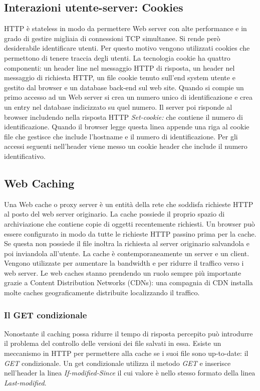 \subsection{Interazioni utente-server: Cookies}
HTTP \`e stateless in modo da permettere Web server con alte performance e in grado di gestire migliaia di connessioni TCP simultanee. Si rende per\`o desiderabile identificare utenti. Per questo motivo 
vengono utilizzati cookies che permettono di tenere traccia degli utenti. La tecnologia cookie ha quattro componenti: un header line nel messaggio HTTP di risposta, un header nel messaggio di richiesta HTTP, 
un file cookie tenuto sull'end system utente e gestito dal browser e un database back-end sul web site. Quando si compie un primo accesso ad un Web server si crea un numero unico di identificazione e crea 
un entry nel database indicizzato su quel numero. Il server poi risponde al browser includendo nella risposta HTTP \emph{Set-cookie:} che contiene il numero di identificazione. Quando il browser legge questa
linea appende una riga al cookie file che gestisce che include l'hostname e il numero di identificazione. Per gli accessi seguenti nell'header viene messo un cookie header che include il numero identificativo. 
\subsection{Web Caching}
Una Web cache o proxy server \`e un entit\`a della rete che soddisfa richieste HTTP al posto del web server originario. La cache possiede il proprio spazio di archiviazione che contiene copie di oggetti 
recentemente richiesti. Un browser pu\`o essere configurato in modo da tutte le richieste HTTP passino prima per la cache. Se questa non possiede il file inoltra la richiesta al server originario salvandola e 
poi inviandola all'utente. La cache \`e contemporaneamente un server e un client. Vengono utilizzate per aumentare la bandwidth e per ridurre il traffico verso i web server. Le web caches stanno prendendo un 
ruolo sempre pi\`u importante grazie a Content Distribution Networks (CDNs): una compagnia di CDN installa molte caches geograficamente distribuite localizzando il traffico. 
\subsubsection{Il GET condizionale}
Nonostante il caching possa ridurre il tempo di risposta percepito pu\`o introdurre il problema del controllo delle versioni dei file salvati in essa. Esiste un meccanismo in HTTP per permettere alla cache se i 
suoi file sono up-to-date: il \emph{GET} condizionale. Un get condizionale utilizza il metodo \emph{GET} e inserisce nell'header la linea \emph{If-modified-Since} il cui valore \`e nello stesso formato della
linea \emph{Last-modified}.
